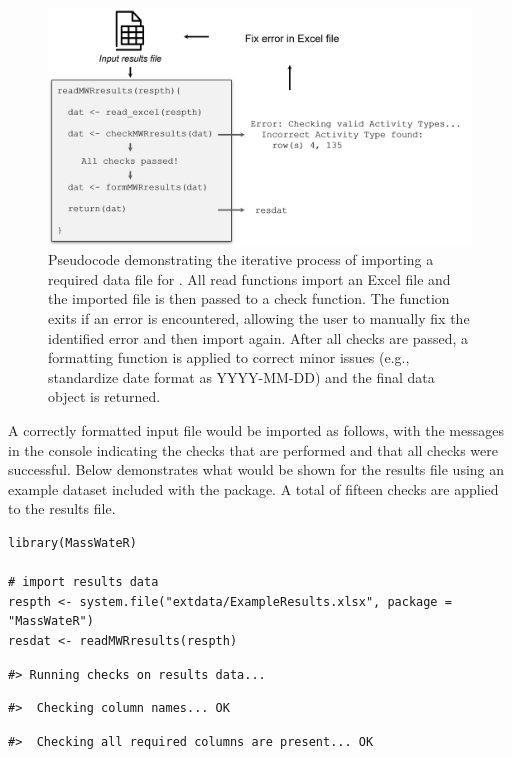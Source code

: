 \begin{figure}
\includegraphics[width=1\linewidth]{figs/importflow} \caption{Pseudocode demonstrating the iterative process of importing a required data file for .  All read functions import an Excel file and the imported file is then passed to a check function.  The function exits if an error is encountered, allowing the user to manually fix the identified error and then import again.  After all checks are passed, a formatting function is applied to correct minor issues (e.g., standardize date format as YYYY-MM-DD) and the final data object is returned.}\label{fig:importflow}
\end{figure}

A correctly formatted input file would be imported as follows, with the messages in the console indicating the checks that are performed and that all checks were successful. Below demonstrates what would be shown for the results file using an example dataset included with the package. A total of fifteen checks are applied to the results file.

\begin{verbatim}
library(MassWateR)

# import results data
respth <- system.file("extdata/ExampleResults.xlsx", package = "MassWateR")
resdat <- readMWRresults(respth)
\end{verbatim}

\begin{verbatim}
#> Running checks on results data...
\end{verbatim}

\begin{verbatim}
#>  Checking column names... OK
\end{verbatim}

\begin{verbatim}
#>  Checking all required columns are present... OK
\end{verbatim}

